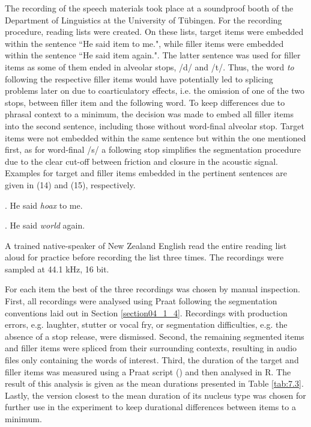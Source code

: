 The recording of the speech materials took place at a soundproof booth of the Department of Linguistics at the University of Tübingen. For the recording procedure, reading lists were created. On these lists, target items were embedded within the sentence ``He said item to me.", while filler items were embedded within the sentence ``He said item again.". The latter sentence was used for filler items as some of them ended in alveolar stops, /d/ and /t/. Thus, the word \textit{to} following the respective filler items would have potentially led to splicing problems later on due to coarticulatory effects, i.e. the omission of one of the two stops, between filler item and the following word. To keep differences due to phrasal context to a minimum, the decision was made to embed all filler items into the second sentence, including those without word-final alveolar stop. Target items were not embedded within the same sentence but within the one mentioned first, as for word-final /s/ a following stop simplifies the segmentation procedure due to the clear cut-off between friction and closure in the acoustic signal. Examples for target and filler items embedded in the pertinent sentences are given in (14) and (15), respectively.

\ex.
\label{ex:14:sentence14}
He said \textit{hoax} to me.

\ex.
\label{ex:15:sentence15}
He said \textit{world} again.

A trained native-speaker of New Zealand English read the entire reading list aloud for practice before recording the list three times. The recordings were sampled at 44.1 kHz, 16 bit. 

For each item the best of the three recordings was chosen by manual inspection. First, all recordings were analysed using Praat following the segmentation conventions laid out in Section \ref{section04_1_4}. Recordings with production errors, e.g. laughter, stutter or vocal fry, or segmentation difficulties, e.g. the absence of a stop release, were dismissed. Second, the remaining segmented items and filler items were spliced from their surrounding contexts, resulting in audio files only containing the words of interest. Third, the duration of the target and filler items was measured using a Praat script (\cite{deJong2008}) and then analysed in R. The result of this analysis is given as the mean durations presented in Table \ref{tab:7.3}. Lastly, the version closest to the mean duration of its nucleus type was chosen for further use in the experiment to keep durational differences between items to a minimum.

